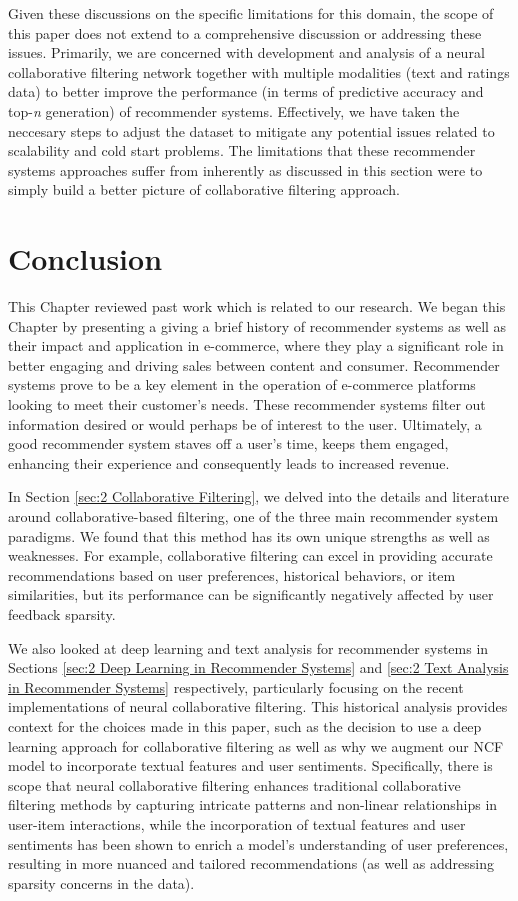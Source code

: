 Given these discussions on the specific limitations for this domain, the scope of this paper does not extend to a comprehensive discussion or addressing these issues. Primarily, we are concerned with development and analysis of a neural collaborative filtering network together with multiple modalities (text and ratings data) to better improve the performance (in terms of predictive accuracy and top-\textit{n} generation) of recommender systems. Effectively, we have taken the neccesary steps to adjust the dataset to mitigate any potential issues related to scalability and cold start problems. The limitations that these recommender systems approaches suffer from inherently as discussed in this section were to simply build a better picture of collaborative filtering approach.

\section{Conclusion}
\label{sec: Conclusion}

This Chapter reviewed past work which is related to our research. We began this Chapter by presenting a giving a brief history of recommender systems as well as their impact and application in e-commerce, where they play a significant role in better engaging and driving sales between content and consumer. Recommender systems prove to be a key element in the operation of e-commerce platforms looking to meet their customer's needs. These recommender systems filter out information desired or would perhaps be of interest to the user. Ultimately, a good recommender system staves off a user's time, keeps them engaged, enhancing their experience and consequently leads to increased revenue.

In Section \ref{sec:2 Collaborative Filtering}, we delved into the details and literature around collaborative-based filtering, one of the three main recommender system paradigms. We found that this method has its own unique strengths as well as weaknesses. For example, collaborative filtering can excel in providing accurate recommendations based on user preferences, historical behaviors, or item similarities, but its performance can be significantly negatively affected by user feedback sparsity.

We also looked at deep learning and text analysis for recommender systems in Sections \ref{sec:2 Deep Learning in Recommender Systems} and \ref{sec:2 Text Analysis in Recommender Systems} respectively, particularly focusing on the recent implementations of neural collaborative filtering. This historical analysis provides context for the choices made in this paper, such as the decision to use a deep learning approach for collaborative filtering as well as why we augment our NCF model to incorporate textual features and user sentiments. Specifically, there is scope that neural collaborative filtering enhances traditional collaborative filtering methods by capturing intricate patterns and non-linear relationships in user-item interactions, while the incorporation of textual features and user sentiments has been shown to enrich a model's understanding of user preferences, resulting in more nuanced and tailored recommendations (as well as addressing sparsity concerns in the data).


